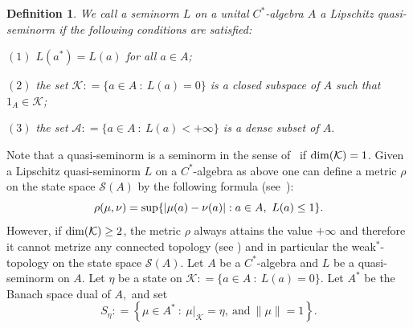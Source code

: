 \documentclass[a4paper,11pt,reqno]{amsart}
\theoremstyle{plain}
\newtheorem{defn}[thm]{Definition}
\theoremstyle{named}
\numberwithin{equation}{section}
\begin{document}
			\begin{defn}\label{def6} We call a seminorm $L$ on a unital $C^{\ast}$-algebra $A$ a Lipschitz {\it quasi}-seminorm if the following conditions are satisfied:
				
				$(1)$ $L(a^{\ast}) = L(a)$ for all $a \in A$;
				
				$(2)$ the set $\mathcal K : = \{a \in A\ :\ L(a) = 0 \}$ is a closed subspace of $A$ such that $1_{A}\in\mathcal{K}$;
				
				$(3)$ the set $\mathcal A : = \{a \in A\ :\ L(a) < +\infty \}$ is a dense subset of $A.$
				
			\end{defn}
			Note that a quasi-seminorm is a seminorm in the sense of~\cite[Section 2]{Rieffel-1999-Metrics-on-state-spaces} if ${\rm dim}(\mathcal K)=1$. Given a Lipschitz quasi-seminorm $L$ on a $C^{\ast}$-algebra as above one can define a metric $\rho$ on the state space $\mathcal S(A)$ by the following formula (see~\cite[Equation 1.1]{Rieffel-1998-Metrics-on-state-from-action-of-cmpt-gp}):
			\begin{displaymath}
				\rho(\mu,\nu)={\rm sup}\{|\mu(a)-\nu(a)|:a\in A, \ L(a)\leq 1\}.
			\end{displaymath}
			However, if ${\rm dim}(\mathcal K)\geq 2$, the metric $\rho$ always attains the value $+\infty$ and therefore it cannot metrize any connected topology (see \cite{https://doi.org/10.1112/blms.12930}) and in particular the weak$^\ast$-topology on the state space $\mathcal S(A)$. 
			Let $A$ be a $C^{\ast}$-algebra and $L$ be a quasi-seminorm on $A.$ Let $\eta$ be a state on $\mathcal K : = \{a \in A\ :\ L(a) = 0 \}.$ Let $A^{\ast}$ be the Banach space dual of $A,$ and set 
			$$S_{\eta} : = \left \{\mu \in A^{\ast}\ :\ \mu \rvert_{\mathcal K} = \eta,\ \text {and}\ \|\mu\| = 1 \right \}.$$
			
\end{document}
